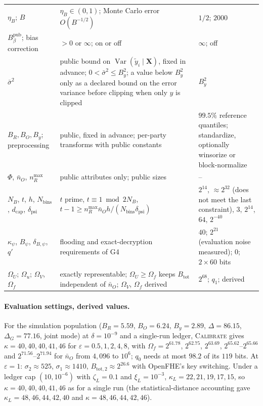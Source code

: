\documentclass[11pt]{article}
\theoremstyle{definition}
\theoremstyle{plain}
\newcommand{\bX}{\mathbf{X}}
\begin{document}
{\begin{longtable}{@{}>{\raggedright\arraybackslash}p{3.1cm}>{\raggedright\arraybackslash}p{7.6cm}>{\raggedright\arraybackslash}p{4.4cm}@{}}
$\eta_B$; $B$ & $\eta_B\in(0,1)$; Monte Carlo error $O(B^{-1/2})$ & $1/2$; $2000$ \\
$B_\beta^{\mathrm{pub}}$; bias correction & $>0$ or $\infty$; on or off & $\infty$; off \\
$\bar\sigma^2$ & public bound on $\operatorname{Var}(\tilde y_i\mid\bX)$, fixed in advance; $0<\bar\sigma^2\le B_y^2$; a value below $B_y^2$ only as a declared bound on the error variance before clipping when only $y$ is clipped & $B_y^2$ \\
$B_R,B_O,B_y$; preprocessing & public, fixed in advance; per-party transforms with public constants & $99.5\%$ reference quantiles; standardize, optionally winsorize or block-normalize \\
$\Phi$, $\bar n_O$, $n_R^{\max}$ & public attributes only; public sizes & -- \\
$N_B$, $t$, $h$, $N_{\mathrm{bins}}$, $d_{\mathrm{cap}}$, $\delta_{\mathrm{psi}}$ & $t$ prime, $t\equiv1\bmod 2N_B$, $t-1\ge n_R^{\max}\bar n_Oh/(N_{\mathrm{bins}}\delta_{\mathrm{psi}})$ & $2^{14}$, $\approx2^{32}$ (does not meet the last constraint), $3$, $2^{14}$, $64$, $2^{-40}$ \\
$\kappa_\psi$, $B_\psi$, $\delta_{B,\psi}$, $q'$ & flooding and exact-decryption requirements of G4 & $40$; $2^{21}$ (evaluation noise measured); $0$; $2\times60$ bits \\
$\Omega_U$; $\Omega_u$; $\Omega_V$, $\Omega_f$ & exactly representable; $\Omega_U\ge\Omega_f$ keeps $B_{\mathrm{tot}}$ independent of $\bar n_O$; $\Omega_V$, $\Omega_f$ derived & $2^{68}$; $q_1$; derived \\
\end{longtable}}

\paragraph{Evaluation settings, derived values.} For the simulation population ($B_R=5.59$, $B_O=6.24$, $B_y=2.89$, $\Delta=86.15$, $\Delta_G=77.16$, joint mode) at $\delta=10^{-9}$ and a single-run ledger, \textsc{Calibrate} gives $\kappa=40,40,40,41,46$ for $\varepsilon=0.5,1,2,4,8$, with $\Omega_f=2^{61.78}$, $2^{62.75}$, $2^{63.69}$, $2^{65.62}$--$2^{65.66}$ and $2^{71.56}$--$2^{71.94}$ for $\bar n_O$ from $4{,}096$ to $10^6$; $q_0$ needs at most $98.2$ of its $119$ bits. At $\varepsilon=1$: $\sigma_2\approx525$, $\sigma_1\approx1410$, $B_{\mathrm{tot},2}\approx2^{26.6}$ with OpenFHE's key switching. Under a ledger cap $(10,10^{-6})$ with $\zeta_L=0.1$ and $\xi_L=10^{-3}$, $\kappa_L=22,21,19,17,15$, so $\kappa=40,40,40,41,46$ as for a single run (the statistical-distance accounting gave $\kappa_L=48,46,44,42,40$ and $\kappa=48,46,44,42,46$).
\end{document}
